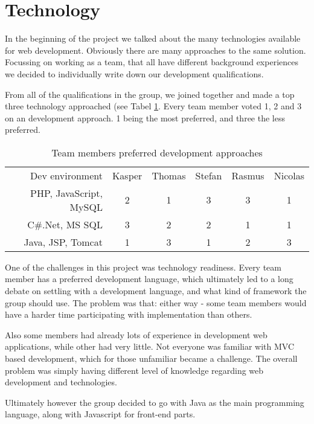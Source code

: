 \section{Technology}
In the beginning of the project we talked about the many technologies available for web development. Obviously there are many approaches to the same solution. Focussing on working as a team, that all have different background experiences we decided to individually write down our development qualifications.

From all of the qualifications in the group, we joined together and made a top three technology approached (see Tabel \ref{tbl:dev_environment}. Every team member voted 1, 2 and 3 on an development approach. 1 being the most preferred, and three the less preferred. 

\begin{table}[h]
\caption{Team members preferred development approaches}\label{tbl:dev_environment}
    \begin{tabular}{rccccc}
    Dev environment        & Kasper & Thomas & Stefan & Rasmus & Nicolas \\
    PHP, JavaScript, MySQL & 2      & 1      & 3      & 3      & 1       \\
    C\#.Net, MS SQL         & 3      & 2      & 2      & 1      & 1       \\
    Java, JSP, Tomcat      & 1      & 3      & 1      & 2      & 3       \\
    \end{tabular}
\end{table}

One of the challenges in this project was technology readiness. Every team member has a preferred development language, which ultimately led to a long debate on settling with a development language, and what kind of framework the group should use.
The problem was that: either way - some team members would have a harder time participating with implementation than others.

Also some members had already lots of experience in development web applications, while other had very little. Not everyone was familiar with MVC based development, which for those unfamiliar became a challenge. The overall problem was simply having different level of knowledge regarding web development and technologies.

Ultimately however the group decided to go with Java as the main programming language, along with Javascript for front-end parts.


